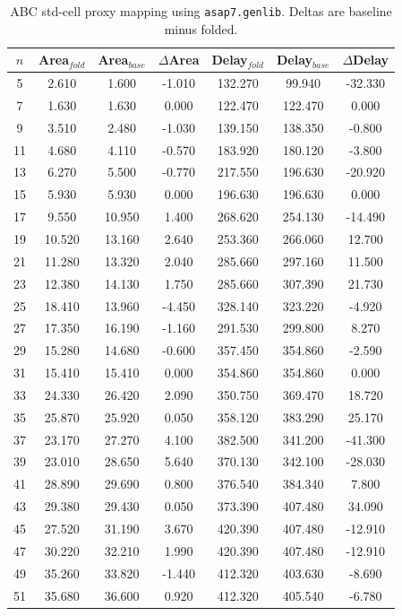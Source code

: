 \begin{table}[t]
\centering
\caption{ABC std-cell proxy mapping using \texttt{asap7.genlib}. Deltas are baseline minus folded.}
\label{tab:stdcell_asap7_genlib}
\begin{tabular}{ccccccc}
\hline
$n$ & Area$_{fold}$ & Area$_{base}$ & $\Delta$Area & Delay$_{fold}$ & Delay$_{base}$ & $\Delta$Delay \\
\hline
5 & 2.610 & 1.600 & -1.010 & 132.270 & 99.940 & -32.330 \\
7 & 1.630 & 1.630 & 0.000 & 122.470 & 122.470 & 0.000 \\
9 & 3.510 & 2.480 & -1.030 & 139.150 & 138.350 & -0.800 \\
11 & 4.680 & 4.110 & -0.570 & 183.920 & 180.120 & -3.800 \\
13 & 6.270 & 5.500 & -0.770 & 217.550 & 196.630 & -20.920 \\
15 & 5.930 & 5.930 & 0.000 & 196.630 & 196.630 & 0.000 \\
17 & 9.550 & 10.950 & 1.400 & 268.620 & 254.130 & -14.490 \\
19 & 10.520 & 13.160 & 2.640 & 253.360 & 266.060 & 12.700 \\
21 & 11.280 & 13.320 & 2.040 & 285.660 & 297.160 & 11.500 \\
23 & 12.380 & 14.130 & 1.750 & 285.660 & 307.390 & 21.730 \\
25 & 18.410 & 13.960 & -4.450 & 328.140 & 323.220 & -4.920 \\
27 & 17.350 & 16.190 & -1.160 & 291.530 & 299.800 & 8.270 \\
29 & 15.280 & 14.680 & -0.600 & 357.450 & 354.860 & -2.590 \\
31 & 15.410 & 15.410 & 0.000 & 354.860 & 354.860 & 0.000 \\
33 & 24.330 & 26.420 & 2.090 & 350.750 & 369.470 & 18.720 \\
35 & 25.870 & 25.920 & 0.050 & 358.120 & 383.290 & 25.170 \\
37 & 23.170 & 27.270 & 4.100 & 382.500 & 341.200 & -41.300 \\
39 & 23.010 & 28.650 & 5.640 & 370.130 & 342.100 & -28.030 \\
41 & 28.890 & 29.690 & 0.800 & 376.540 & 384.340 & 7.800 \\
43 & 29.380 & 29.430 & 0.050 & 373.390 & 407.480 & 34.090 \\
45 & 27.520 & 31.190 & 3.670 & 420.390 & 407.480 & -12.910 \\
47 & 30.220 & 32.210 & 1.990 & 420.390 & 407.480 & -12.910 \\
49 & 35.260 & 33.820 & -1.440 & 412.320 & 403.630 & -8.690 \\
51 & 35.680 & 36.600 & 0.920 & 412.320 & 405.540 & -6.780 \\
\hline
\end{tabular}
\end{table}
